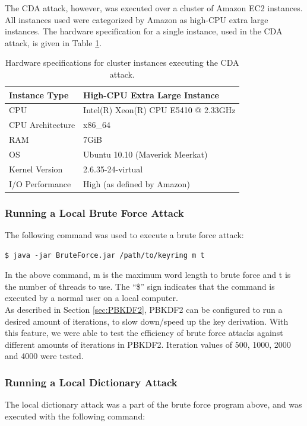 \documentclass[pdftex,english,10pt,b5paper,twoside]{book}
\begin{document}
\noindent The CDA attack, however, was executed over a cluster of Amazon \ac{EC2}
instances. All instances used were categorized by Amazon as high-CPU extra large
instances. The hardware specification for a single instance, used in the CDA
attack, is given in Table \ref{tab:hwcda}.

    \begin{table}[!h]
    \centering
    \caption{Hardware specifications for cluster instances executing the CDA
    attack.}
    \label{tab:hwcda}
    \begin{tabular}{| l | l |}
	\hline
	Instance Type	    &High-CPU Extra Large Instance\\
	\hline
	CPU		    &Intel(R) Xeon(R) CPU E5410 @ 2.33GHz\\
	\hline
	CPU Architecture    &x86\_64\\
	\hline
	RAM		    &7GiB\\
	\hline
	OS		    &Ubuntu 10.10 (Maverick Meerkat)\\
	\hline
	Kernel Version	    &2.6.35-24-virtual\\
	\hline
	I/O Performance	    &High (as defined by Amazon)\\
	\hline
    \end{tabular}
\end{table}
\subsubsection{Running a Local Brute Force Attack}
The following command was used to execute a brute force
attack:

\lstset{label=lst:bf, caption=Running local brute force attack}
\begin{lstlisting}
$ java -jar BruteForce.jar /path/to/keyring m t
\end{lstlisting}

\noindent In the above command, m is the maximum word length to brute force and t
is the number of threads to use. The ``\$'' sign indicates that the command is
executed by a normal user on a local computer.\\

\noindent As described in Section \ref{sec:PBKDF2}, PBKDF2 can be configured to run a desired
amount of iterations, to slow down/speed up the key derivation. With this
feature, we were able to test the efficiency of brute force attacks against
different amounts of iterations in PBKDF2. Iteration values of 500, 1000, 2000
and 4000 were tested.

\subsubsection{Running a Local Dictionary Attack}
The local dictionary attack was a part of the brute force program above, and was
executed with the following command:
\end{document}
